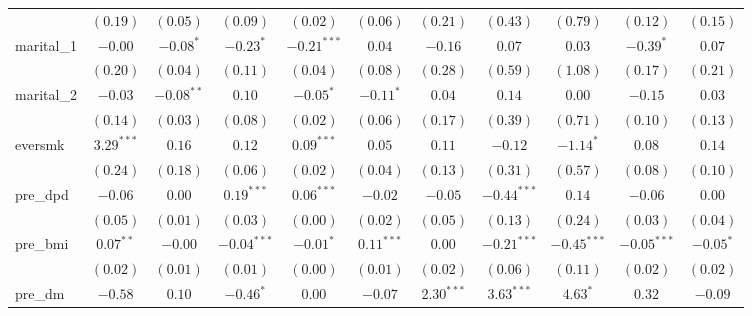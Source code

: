 \begin{tabular}{l c c c c c c c c c c}
                 & $(0.19)$      & $(0.05)$      & $(0.09)$      & $(0.02)$      & $(0.06)$      & $(0.21)$       & $(0.43)$      & $(0.79)$       & $(0.12)$       & $(0.15)$      \\
marital\_1       & $-0.00$       & $-0.08^{*}$   & $-0.23^{*}$   & $-0.21^{***}$ & $0.04$        & $-0.16$        & $0.07$        & $0.03$         & $-0.39^{*}$    & $0.07$        \\
                 & $(0.20)$      & $(0.04)$      & $(0.11)$      & $(0.04)$      & $(0.08)$      & $(0.28)$       & $(0.59)$      & $(1.08)$       & $(0.17)$       & $(0.21)$      \\
marital\_2       & $-0.03$       & $-0.08^{**}$  & $0.10$        & $-0.05^{*}$   & $-0.11^{*}$   & $0.04$         & $0.14$        & $0.00$         & $-0.15$        & $0.03$        \\
                 & $(0.14)$      & $(0.03)$      & $(0.08)$      & $(0.02)$      & $(0.06)$      & $(0.17)$       & $(0.39)$      & $(0.71)$       & $(0.10)$       & $(0.13)$      \\
eversmk          & $3.29^{***}$  & $0.16$        & $0.12$        & $0.09^{***}$  & $0.05$        & $0.11$         & $-0.12$       & $-1.14^{*}$    & $0.08$         & $0.14$        \\
                 & $(0.24)$      & $(0.18)$      & $(0.06)$      & $(0.02)$      & $(0.04)$      & $(0.13)$       & $(0.31)$      & $(0.57)$       & $(0.08)$       & $(0.10)$      \\
pre\_dpd         & $-0.06$       & $0.00$        & $0.19^{***}$  & $0.06^{***}$  & $-0.02$       & $-0.05$        & $-0.44^{***}$ & $0.14$         & $-0.06$        & $0.00$        \\
                 & $(0.05)$      & $(0.01)$      & $(0.03)$      & $(0.00)$      & $(0.02)$      & $(0.05)$       & $(0.13)$      & $(0.24)$       & $(0.03)$       & $(0.04)$      \\
pre\_bmi         & $0.07^{**}$   & $-0.00$       & $-0.04^{***}$ & $-0.01^{*}$   & $0.11^{***}$  & $0.00$         & $-0.21^{***}$ & $-0.45^{***}$  & $-0.05^{***}$  & $-0.05^{*}$   \\
                 & $(0.02)$      & $(0.01)$      & $(0.01)$      & $(0.00)$      & $(0.01)$      & $(0.02)$       & $(0.06)$      & $(0.11)$       & $(0.02)$       & $(0.02)$      \\
pre\_dm          & $-0.58$       & $0.10$        & $-0.46^{*}$   & $0.00$        & $-0.07$       & $2.30^{***}$   & $3.63^{***}$  & $4.63^{*}$     & $0.32$         & $-0.09$       \\

\end{tabular}
